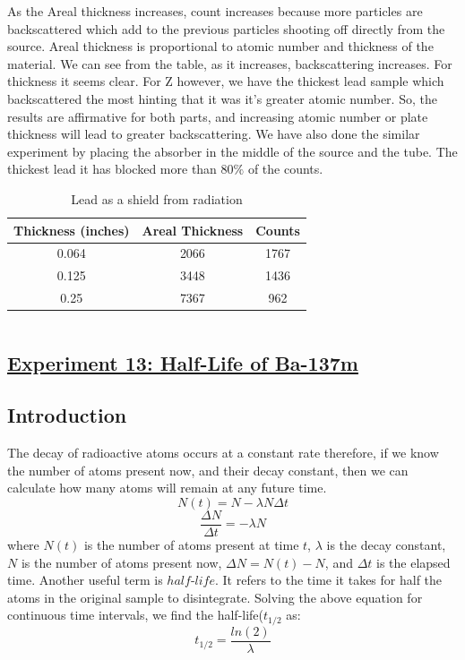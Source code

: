 \documentclass[twocolumn]{article}
\begin{document}
As the Areal thickness increases, count increases because more particles are backscattered which add to the previous particles shooting off directly from the source. Areal thickness is proportional to atomic number and thickness of the material. We can see from the table, as it increases, backscattering increases. For thickness it seems clear. For Z however, we have the thickest lead sample which backscattered the most hinting that it was it's greater atomic number. So, the results are affirmative for both parts, and increasing atomic number or plate thickness will lead to greater backscattering. We have also done the similar experiment by placing the absorber in the middle of the source and the tube. The thickest lead  it has blocked more than 80$\%$ of the counts. \\
\begin{table}[h!]
    \centering
    \caption{Lead as a shield from radiation}
    \begin{tabular}{|c|c|c|}
        \hline
        Thickness (inches) & Areal Thickness & Counts \\
        \hline
        0.064 & 2066 & 1767 \\
        \hline
        0.125 & 3448 & 1436 \\
        \hline
        0.25 & 7367 & 962 \\
        \hline
    \end{tabular}
\end{table}
$$$$

\begin{center}\section*{\underline{Experiment 13: Half-Life of Ba-137m}}\end{center}
\subsection*{Introduction}
The decay of radioactive atoms occurs at a constant rate therefore, if we know the number of atoms present now, and their decay constant, then we can calculate how many atoms will remain at any future time. 
\begin{equation*}
N(t)=N-\lambda N\Delta t
\end{equation*}
\begin{equation*}
\frac{\Delta N}{\Delta t}=-\lambda N
\end{equation*}
where $N(t)$ is the number of atoms present at time $t$, $\lambda$ is the decay constant, $N$ is the number of atoms present now, $\Delta N=N(t)-N$, and $\Delta t$ is the elapsed time. Another useful term is $half$-$life$. It refers to the time it takes for half the atoms in the original sample to disintegrate. Solving the above equation for continuous time intervals, we find the half-life($t_{1/2}$ as:
\begin{equation*}
t_{1/2}=\frac{ln(2)}{\lambda}
\end{equation*}
\end{document}
